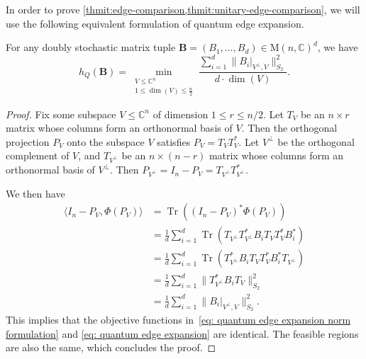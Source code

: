 \documentclass{toc}
\theoremstyle{plain}
\numberwithin{equation}{section}
\theoremstyle{definition}
\newcommand{\bC}{\mathbb{C}}
\DeclareMathOperator{\trace}{Tr}
\newcommand{\norm}[1]{\lVert#1\rVert}
\newcommand{\M}{\mathrm{M}}
\newcommand{\tuple}[1]{\mathbf{#1}}
\newcommand{\vB}{\tuple{B}}
\begin{document}
In order to prove \cref{thmit:edge-comparison,thmit:unitary-edge-comparison}, we will use the following equivalent formulation of quantum edge expansion.
\begin{lemma}\label{lem: quantum edge expansion norm formulation}
  For any doubly stochastic matrix tuple $\vB=(B_1,\dots,B_d) \in \M(n,\bC)^d$, we have
  \begin{equation}\label{eq: quantum edge expansion norm formulation}
    h_Q(\vB)=\min_{\substack{V \leq \bC^n\\1\leq\dim(V)\leq\frac{n}{2}}}\frac{\sum_{i=1}^d\norm{B_i|_{V^\perp,V}}_{S_2}^2}{d\cdot\dim(V)}.
  \end{equation}
\end{lemma}
\begin{proof}
  Fix some subspace $V \leq \bC^n$ of dimension $1 \leq r \leq n/2$.
  Let $T_V$ be an $n\times r$ matrix whose columns form an 
  orthonormal basis of $V$. Then the orthogonal projection $P_V$ onto the subspace $V$ satisfies $P_V=T_V T^*_V$. 
    Let 
  $V^\perp$ be the orthogonal complement of $V$, and $T_{V^\perp}$ be an 
  $n\times (n-r)$ matrix whose columns form an orthonormal basis of $V^\perp$. Then 
  $P_{V^\perp}=I_n-P_V=T_{V^\perp}T_{V^\perp}^*$.
  
  We then have 
  \[
  \begin{split}
    \langle I_n-P_V,\Phi(P_V)\rangle&=\trace((I_n-P_V)^*\Phi(P_V))\\
    &=\frac 1d\sum_{i=1}^d\trace\left(T_{V^\perp}
                T_{V^\perp}^* B_iT_VT^*_VB_i^*\right)\\
    &=\frac 1d \sum_{i=1}^d\trace\left(T_{V^\perp}^*B_iT_VT^*_VB_i^*T_{V^\perp}\right)\\
    &=\frac 1d\sum_{i=1}^d\norm{T_{V^\perp}^*B_iT_V}_{S_2}^2\\
        &=\frac 1d\sum_{i=1}^d\norm{B_i|_{V^\perp, V}}_{S_2}^2.
  \end{split}
  \]
  This implies that the objective functions in~\eqref{eq: quantum edge expansion norm formulation} and \eqref{eq: quantum edge expansion} are identical. The feasible regions are also the same, which concludes the proof.
\end{proof}
\end{document}
